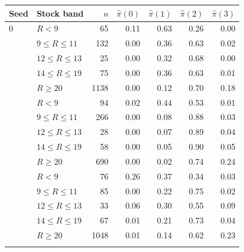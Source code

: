 \begin{tabular}{llrrrrr}
\toprule
Seed & Stock band & $n$ & $\hat\pi(0)$ & $\hat\pi(1)$ & $\hat\pi(2)$ & $\hat\pi(3)$ \\
\midrule
0 & $R<9$ & 65 & 0.11 & 0.63 & 0.26 & 0.00 \\
 & $9\le R\le 11$ & 132 & 0.00 & 0.36 & 0.63 & 0.02 \\
 & $12\le R\le 13$ & 25 & 0.00 & 0.32 & 0.68 & 0.00 \\
 & $14\le R\le 19$ & 75 & 0.00 & 0.36 & 0.63 & 0.01 \\
 & $R\ge 20$ & 1138 & 0.00 & 0.12 & 0.70 & 0.18 \\
\addlinespace
1 & $R<9$ & 94 & 0.02 & 0.44 & 0.53 & 0.01 \\
 & $9\le R\le 11$ & 266 & 0.00 & 0.08 & 0.88 & 0.03 \\
 & $12\le R\le 13$ & 28 & 0.00 & 0.07 & 0.89 & 0.04 \\
 & $14\le R\le 19$ & 58 & 0.00 & 0.05 & 0.90 & 0.05 \\
 & $R\ge 20$ & 690 & 0.00 & 0.02 & 0.74 & 0.24 \\
\addlinespace
2 & $R<9$ & 76 & 0.26 & 0.37 & 0.34 & 0.03 \\
 & $9\le R\le 11$ & 85 & 0.00 & 0.22 & 0.75 & 0.02 \\
 & $12\le R\le 13$ & 33 & 0.06 & 0.30 & 0.55 & 0.09 \\
 & $14\le R\le 19$ & 67 & 0.01 & 0.21 & 0.73 & 0.04 \\
 & $R\ge 20$ & 1048 & 0.01 & 0.14 & 0.62 & 0.23 \\
\addlinespace
\bottomrule
\end{tabular}
